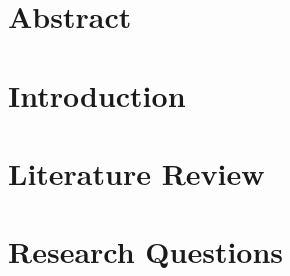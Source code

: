 \documentclass[a4paper,10pt,twoside]{report}
\author{\me}
\def\chaptersep{}
\begin{document}


\normalsize

\chaptersep


%

%

\chapter*{Abstract}\label{chapter:abstract}

\chaptersep


\chaptersep

\tableofcontents
\chaptersep




\chapter{Introduction}\label{chapter:introduction}
\setcounter{page}{0}


\chaptersep

\chapter{Literature Review}\label{chapter:preliminaries}


\chaptersep

\chapter{Research Questions}\label{chapter:first_real_chapter}

\end{document}
